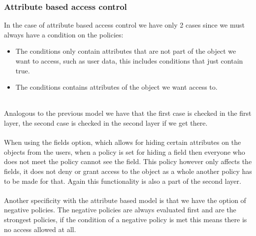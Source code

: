 \subsubsection{Attribute based access control}
In the case of attribute based access control we have only 2 cases since we must always have a condition on the policies:
\begin{itemize}
    \item The conditions only contain attributes that are not part of the object we want to access, such as user data, this includes conditions that just contain true.
    \item The conditions contains attributes of the object we want access to.
\end{itemize}
\\
Analogous to the previous model we have that the first case is checked in the first layer, the second case is checked in the second layer if we get there.
\\
\\
When using the fields option, which allows for hiding certain attributes on the objects from the users, when a policy is set for hiding a field then everyone who does not meet the policy cannot see the field.
This policy however only affects the fields, it does not deny or grant access to the object as a whole another policy has to be made for that.
Again this functionality is also a part of the second layer.
\\
\\
Another specificity with the attribute based model is that we have the option of negative policies.
The negative policies are always evaluated first and are the strongest policies, if the condition of a negative policy is met this means there is no access allowed at all.

